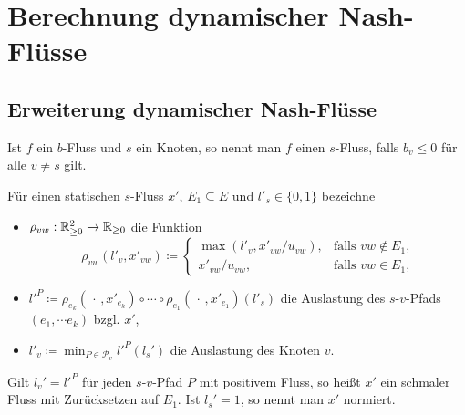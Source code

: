 \section{Berechnung dynamischer Nash-Flüsse}

\subsection{Erweiterung dynamischer Nash-Flüsse}

\begin{frame}
\begin{definition}[$s$-Fluss]
	Ist $f$ ein $b$-Fluss und $s$ ein Knoten, so nennt man $f$ einen $s$-Fluss, falls $b_v\leq 0$ für alle $v\neq s$ gilt.
\end{definition}

\pause\begin{definition}\label{def-thin-flow}
		Für einen statischen $s$-Fluss $x'$, $E_1\subseteq E$ und $l'_s\in\{ 0, 1 \}$ bezeichne
		\begin{itemize}[label=\color{darkblue}$\bullet$]
			\pause\item $\rho_{vw}: \mathbb{R}_{\geq 0}^2 \to \mathbb{R}_{\geq 0}$ die Funktion \[ \rho_{vw}(l'_v, x'_{vw}) \coloneq \begin{cases}
			\max(l'_v, x'_{vw} / u_{vw}), & \text{falls $vw\notin E_1$,}\\
			x'_{vw} / u_{vw}, & \text{falls $vw\in E_1$,}
			\end{cases}
			\]
			\item\pause $l'^P\coloneq \rho_{e_k}(\,\cdot\,, x'_{e_k}) \circ \cdots \circ \rho_{e_1}(\,\cdot\,, x'_{e_1}) (l'_s)$ die Auslastung des $s$-$v$-Pfads $(e_1, \cdots e_k)$ bzgl. $x'$,
			\item\pause $l'_v \coloneq \min_{P\in\mathcal{P}_v} l'^P(l_s')$ die Auslastung des Knoten $v$.
		\end{itemize}
		\pause Gilt $l_v' = l'^P$ für jeden $s$-$v$-Pfad $P$ mit positivem Fluss, so heißt $x'$ ein schmaler Fluss mit Zurücksetzen auf $E_1$.
		Ist $l_s' = 1$, so nennt man $x'$ normiert.
	\end{definition}
\end{frame}

